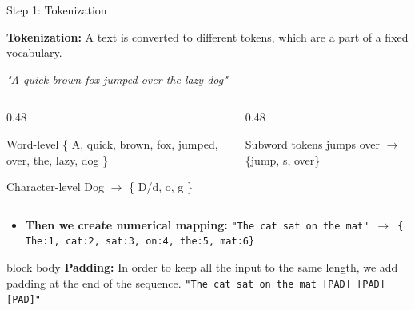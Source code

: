 \documentclass[aspectratio=169,xcolor=dvipsnames,svgnames,x11names,fleqn]{beamer}
\begin{document}
\begin{frame}{Step 1: Tokenization}
    \small
    \begin{tcolorbox}[colback=tokenGraphite, colframe=tokenGraphite, arc=1mm, fontupper=\color{white}]
        \textbf{Tokenization:} A text is converted to different tokens, which are a part of a fixed vocabulary.
    \end{tcolorbox}

    \vspace{5pt}
    \textit{"A quick brown fox jumped over the lazy dog"}

    \begin{columns}[T]
        \begin{column}{0.48\textwidth}
            \begin{block}{Word-level}
                \scriptsize \{ A, quick, brown, fox, jumped, over, the, lazy, dog \}
            \end{block}
            \begin{block}{Character-level}
                \scriptsize Dog $\to$ \{ D/d, o, g \}
            \end{block}
        \end{column}
        \begin{column}{0.48\textwidth}
            \begin{block}{Subword tokens}
                \scriptsize jumps over $\to$ \{jump, s, over\}
            \end{block}
        \end{column}
    \end{columns}

    \vspace{5pt}
    \begin{itemize}
        \item[\textcolor{tokenMint}{\faHashtag}] \textbf{Then we create numerical mapping:}
        \footnotesize \texttt{"The cat sat on the mat" $\to$ \{ The:1, cat:2, sat:3, on:4, the:5, mat:6\}}
    \end{itemize}

    \begin{beamercolorbox}[wd=\textwidth, sep=6pt, rounded=true]{block body}
        \footnotesize \textbf{Padding:} In order to keep all the input to the same length, we add padding at the end of the sequence.
        \vspace{3pt}
        \centering
        \texttt{\textcolor{tokenGraphite}{"The cat sat on the mat [PAD] [PAD] [PAD]"}}
    \end{beamercolorbox}
\end{frame}
\end{document}
